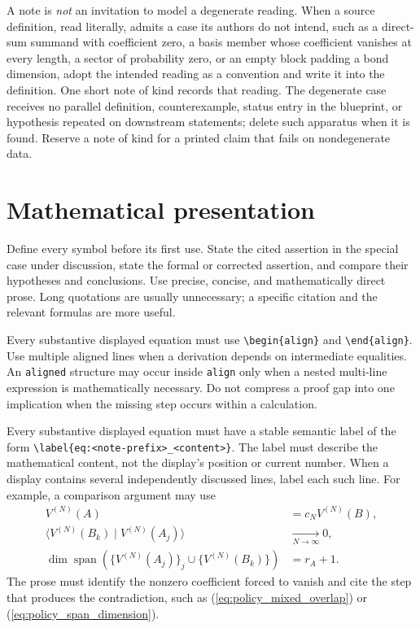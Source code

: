 \documentclass{article}
\providecommand{\braket}[2]{\langle #1\mid #2\rangle}
\begin{document}
A note is \emph{not} an invitation to model a degenerate reading. When a source
definition, read literally, admits a case its authors do not intend, such as a
direct-sum summand with coefficient zero, a basis member whose coefficient
vanishes at every length, a sector of probability zero, or an empty block
padding a bond dimension, adopt the intended reading as a convention and write
it into the definition. One short note of kind  records
that reading. The degenerate case receives no parallel definition,
counterexample, status entry in the blueprint, or hypothesis repeated on
downstream statements; delete such apparatus when it is found. Reserve a note
of kind  for a printed claim that fails on nondegenerate
data.

\section{Mathematical presentation}

Define every symbol before its first use. State the cited assertion in the
special case under discussion, state the formal or corrected assertion, and
compare their hypotheses and conclusions. Use precise, concise, and
mathematically direct prose. Long quotations are usually unnecessary; a
specific citation and the relevant formulas are more useful.

Every substantive displayed equation must use
\verb|\begin{align}| and \verb|\end{align}|. Use multiple aligned lines when a
derivation depends on intermediate equalities. An \verb|aligned| structure may
occur inside \verb|align| only when a nested multi-line expression is
mathematically necessary. Do not compress a proof gap into one implication when
the missing step occurs within a calculation.

Every substantive displayed equation must have a stable semantic label of the
form \verb|\label{eq:<note-prefix>_<content>}|. The label must describe the
mathematical content, not the display's position or current number. When a
display contains several independently discussed lines, label each such line.
For example, a comparison argument may use
\begin{align}
    V^{(N)}(A)
        &= c_N V^{(N)}(B),
    \label{eq:policy_proportional_vectors}\\
    \braket{V^{(N)}(B_k)}{V^{(N)}(A_j)}
        &\xrightarrow[N\to\infty]{}0,
    \label{eq:policy_mixed_overlap}\\
    \dim\operatorname{span}
        \left(\{V^{(N)}(A_j)\}_j\cup\{V^{(N)}(B_k)\}\right)
        &= r_A+1.
    \label{eq:policy_span_dimension}
\end{align}
The prose must identify the nonzero coefficient forced to vanish and cite the
step that produces the contradiction, such as
(\ref{eq:policy_mixed_overlap}) or
(\ref{eq:policy_span_dimension}).
\end{document}
